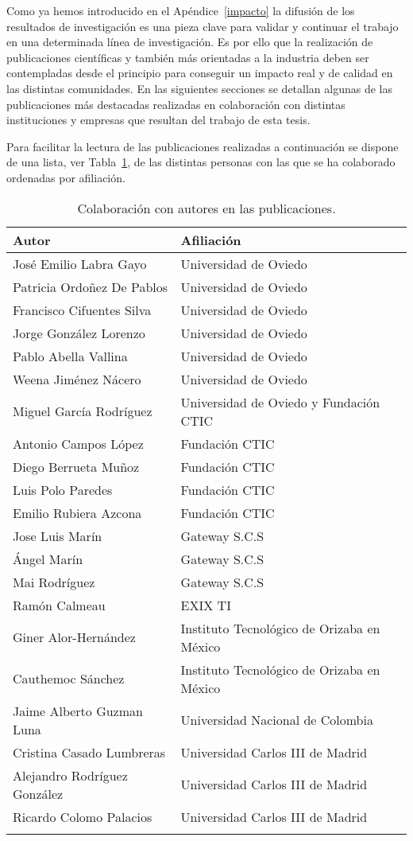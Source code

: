 Como ya hemos introducido en el Apéndice~\ref{impacto} la difusión de los resultados
de investigación es una pieza clave para validar y continuar el trabajo en una
determinada línea de investigación. Es por ello que la realización de publicaciones
científicas y también más orientadas a la industria deben ser contempladas
desde el principio para conseguir un impacto real y de calidad en las distintas
comunidades. En las siguientes secciones se detallan algunas de las publicaciones
más destacadas realizadas en colaboración con distintas instituciones y empresas 
que resultan del trabajo de esta tesis.

Para facilitar la lectura de las publicaciones realizadas a continuación 
se dispone de una lista, ver Tabla~\ref{table:publications}, de las distintas personas con las que se ha
colaborado ordenadas por afiliación.

\begin{longtable}[c]{|p{8cm}|p{6cm}|} 
\hline
  \textbf{Autor} & \textbf{Afiliación} \\\hline
\endhead
 José Emilio Labra Gayo & Universidad de Oviedo \\\hline
 Patricia Ordoñez De Pablos & Universidad de Oviedo \\\hline
 Francisco Cifuentes Silva & Universidad de Oviedo \\\hline
 Jorge González Lorenzo & Universidad de Oviedo \\\hline
 Pablo Abella Vallina & Universidad de Oviedo \\\hline
 Weena Jiménez Nácero & Universidad de Oviedo \\\hline
 Miguel García Rodríguez & Universidad de Oviedo y Fundación CTIC\\\hline
 Antonio Campos López & Fundación CTIC\\\hline
 Diego Berrueta Muñoz & Fundación CTIC\\\hline
 Luis Polo Paredes & Fundación CTIC\\\hline
 Emilio Rubiera Azcona & Fundación CTIC\\\hline
 Jose Luis Marín & Gateway S.C.S\\\hline
 Ángel Marín & Gateway S.C.S\\\hline
 Mai Rodríguez & Gateway S.C.S\\\hline
 Ramón Calmeau & EXIX TI\\\hline
 Giner Alor-Hernández & Instituto Tecnológico de Orizaba en México\\\hline
 Cauthemoc Sánchez & Instituto Tecnológico de Orizaba en México\\\hline
 Jaime Alberto Guzman Luna & Universidad Nacional de Colombia\\\hline
 Cristina Casado Lumbreras & Universidad Carlos III de Madrid\\\hline
 Alejandro Rodríguez González & Universidad Carlos III de Madrid\\\hline
 Ricardo Colomo Palacios & Universidad Carlos III de Madrid\\\hline
\hline
\caption{Colaboración con autores en las publicaciones.}\label{table:publications}\\    
\end{longtable}

